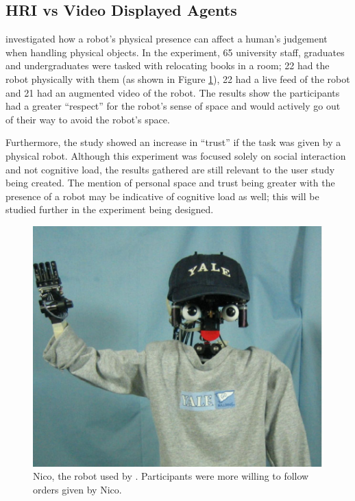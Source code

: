 \documentclass[conference]{IEEEtran}
\begin{document}
\subsection{HRI vs Video Displayed Agents}
\citet{bainbridge2011benefits} investigated how a robot's physical presence can affect a human's judgement when handling physical objects. In the experiment, 65 university staff, graduates and undergraduates were tasked with relocating books in a room; 22 had the robot physically with them (as shown in Figure \ref{fig:nico_experimentl}), 22 had a live feed of the robot and 21 had an augmented video of the robot. The results show the participants had a greater ``respect'' for the robot's sense of space and would actively go out of their way to avoid the robot's space.

Furthermore, the study showed an increase in ``trust'' if the task was given by a physical robot. Although this experiment was focused solely on social interaction and not cognitive load, the results gathered are still relevant to the user study being created. The mention of personal space and trust being greater with the presence of a robot may be indicative of cognitive load as well; this will be studied further in the experiment being designed.

\begin{figure}[h!]
    \centering
    \includegraphics[width=0.95\linewidth]{figures/Nico.PNG}
    \caption{\label{fig:nico_experimentl}Nico, the robot used by \citet{bainbridge2011benefits}. Participants were more willing to follow orders given by Nico.}
\end{figure} 
\end{document}
